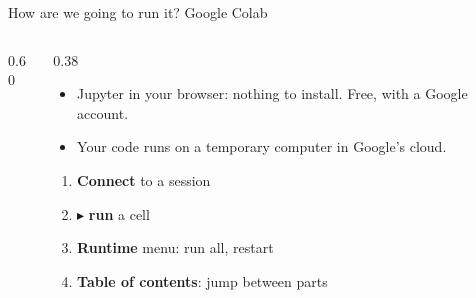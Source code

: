 \begin{frame}{How are we going to run it? Google Colab}
\begin{columns}[c]
\begin{column}{0.60\linewidth}
    \end{column}
    \begin{column}{0.38\linewidth}\small
      \begin{itemize}\setlength\itemsep{3pt}
        \item Jupyter in your \alert{browser}: nothing to install. Free, with a Google account.
        \item Your code runs on a \alert{temporary computer} in Google's cloud.
      \end{itemize}
      \vspace{0.1cm}
      \begin{enumerate}\setlength\itemsep{2pt}\footnotesize
        \item[\textcolor{accentred}{\textbf{1}}] \textbf{Connect} to a session
        \item[\textcolor{accentred}{\textbf{2}}] $\blacktriangleright$ \textbf{run} a cell
        \item[\textcolor{accentred}{\textbf{3}}] \textbf{Runtime} menu: run all, restart
        \item[\textcolor{accentred}{\textbf{4}}] \textbf{Table of contents}: jump between parts
      \end{enumerate}
    \end{column}
  \end{columns}
\end{frame}

